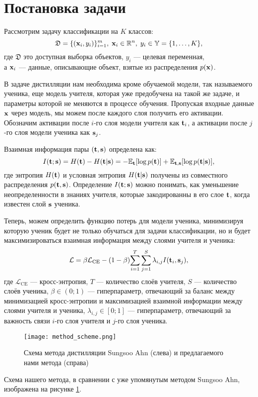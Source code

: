 \section{Постановка задачи}

Рассмотрим задачу классификации на $K$ классов:
$$\mathfrak{D}  = \{(\bold{x}_i, y_i)\}_{i=1}^{m},\; \bold{x}_i \in \mathbb{R}^n,\; y_i \in \mathbb{Y}  = \{1, \dots, K\},$$
где $\mathfrak{D}$ это доступная выборка объектов, $y_i$ --- целевая переменная, \\
а $\bold{x}_i$ --- данные, описывающие объект, взятые из распределения $p(\bold{x})$.

В задаче дистилляции нам необходима кроме обучаемой модели, так называемого ученика, еще модель учителя,
которая уже предобучена на такой же задаче, и параметры которой не меняются в процессе обучения.
Пропуская входные данные $\bold{x}$ через модель, мы можем после каждого слоя получить его активации.
Обозначим активации после $i$-го слоя модели учителя как $\bold{t}_i$, а активации после $j$-го слоя модели ученика как $\bold{s}_j$.

Взаимная информация \cite{Ahn_2019_CVPR} пары $(\bold{t}, \bold{s})$ определена как:
$$ I(\bold{t}; \bold{s}) = H(\bold{t}) - H(\bold{t} | \bold{s}) =  -\mathbb{E}_{\bold{t}}[\log{p(\bold{t})}] + \mathbb{E}_{\bold{t},\bold{s}}[\log{p(\bold{t}|\bold{s})}],$$
где энтропия $H(\bold{t})$ и условная энтропия $H(\bold{t}|\bold{s})$ получены из совместного распределения $p(\bold{t},\bold{s})$.
Определение $I(\bold{t}; \bold{s})$ можно понимать, как уменьшение неопределенности в знаниях учителя, которые закодированны в его слое $\bold{t}$,
когда известен слой $\bold{s}$ ученика.

Теперь, можем определить функцию потерь для модели ученика, минимизируя которую ученик будет не только обучаться для задачи классификации,
но и будет максимизироваться взаимная информация между слоями учителя и ученика:
$$\mathcal{L} = \beta \mathcal{L}_\text{CE} - (1 - \beta){\sum_{i=1}^T \sum_{j=1}^S \lambda_{i, j}I(\bold{t}_{i}, \bold{s}_{j})},$$
где $\mathcal{L}_\text{CE}$ --- кросс-энтропия, $T$ --- количество слоёв учителя, $S$ --- количество слоёв ученика, $\beta \in (0;1)$ --- гиперпараметр,
отвечающий за баланс между минимизацией кросс-энтропии и максимизацией взаимной информации между слоями учителя и ученика, $\lambda_{i, j} \in [0;1]$ ---
гиперпараметр, отвечающий за важность связи $i$-го слоя учителя и $j$-го слоя ученика.

\begin{figure}[!htbp]
    \centering
    \texttt{[image: method\_scheme.png]}
    \caption{Схема метода дистилляции Sungsoo Ahn \cite{Ahn_2019_CVPR} (слева) и предлагаемого нами метода (справа)}
    \label{fig:method_scheme}
\end{figure}

Схема нашего метода, в сравнении с уже упомянутым методом Sungsoo Ahn\cite{Ahn_2019_CVPR}, изображена на рисунке \ref{fig:method_scheme}.
